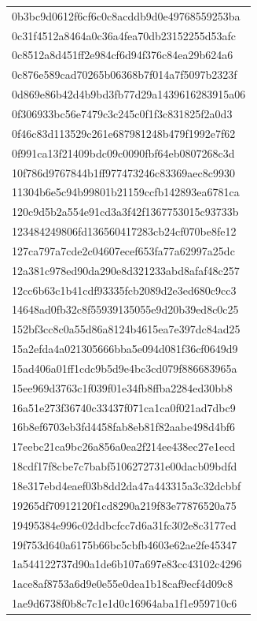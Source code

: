 \begin{tabular}{l}
0b3bc9d0612f6cf6c0c8acddb9d0e49768559253ba \\
0c31f4512a8464a0c36a4fea70db23152255d53afc \\
0c8512a8d451ff2e984cf6d94f376c84ea29b624a6 \\
0c876e589cad70265b06368b7f014a7f5097b2323f \\
0d869e86b42d4b9bd3fb77d29a1439616283915a06 \\
0f306933bc56e7479c3c245c0f1f3c831825f2a0d3 \\
0f46c83d113529c261e687981248b479f1992e7f62 \\
0f991ca13f21409bdc09c0090fbf64eb0807268c3d \\
10f786d9767844b1ff977473246c83369aec8c9930 \\
11304b6e5c94b99801b21159ccfb142893ea6781ca \\
120c9d5b2a554e91cd3a3f42f1367753015c93733b \\
123484249806fd136560417283cb24cf070be8fe12 \\
127ca797a7cde2c04607ecef653fa77a62997a25dc \\
12a381c978ed90da290e8d321233abd8afaf48c257 \\
12cc6b63c1b41cdf93335fcb2089d2e3ed680c9cc3 \\
14648ad0fb32c8f55939135055e9d20b39ed8c0c25 \\
152bf3cc8c0a55d86a8124b4615ea7e397dc84ad25 \\
15a2efda4a021305666bba5e094d081f36cf0649d9 \\
15ad406a01ff1cdc9b5d9e4bc3cd079f886683965a \\
15ee969d3763c1f039f01e34fb8ffba2284ed30bb8 \\
16a51e273f36740c33437f071ca1ca0f021ad7dbc9 \\
16b8ef6703eb3fd4458fab8eb81f82aabe498d4bf6 \\
17eebc21ca9bc26a856a0ea2f214ee438ec27e1ecd \\
18cdf17f8cbe7c7babf5106272731e00dacb09bdfd \\
18e317ebd4eaef03b8dd2da47a443315a3c32dcbbf \\
19265df70912120f1cd8290a219f83e77876520a75 \\
19495384e996c02ddbcfcc7d6a31fc302e8c3177ed \\
19f753d640a6175b66bc5cbfb4603e62ae2fe45347 \\
1a544122737d90a1de6b107a697e83cc43102c4296 \\
1ace8af8753a6d9e0e55e0dea1b18caf9ecf4d09c8 \\
1ae9d6738f0b8c7c1e1d0c16964aba1f1e959710c6 \\

\end{tabular}
